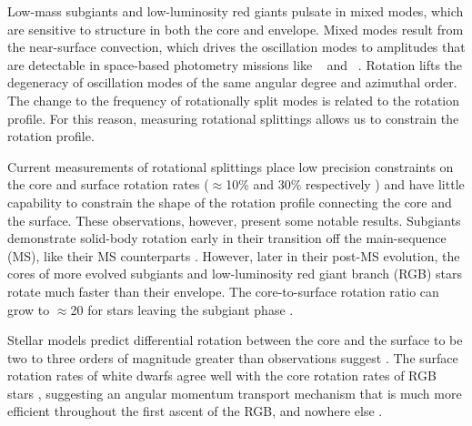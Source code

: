 Low-mass subgiants and low-luminosity red giants pulsate in mixed modes, which are sensitive to structure in both the core and envelope. Mixed modes result from the near-surface convection, which drives the oscillation modes to amplitudes that are detectable in space-based photometry missions like \corot\ \citep{baglin_corot_2003} and \kepler\ \citep{borucki_kepler_2010}. Rotation lifts the degeneracy of oscillation modes of the same angular degree and azimuthal order. The change to the frequency of rotationally split modes is related to the rotation profile. For this reason, measuring rotational splittings allows us to constrain the rotation profile.


Current measurements of rotational splittings place low precision constraints on the core and surface rotation rates ($\approx$10\% and 30\% respectively ) and have little capability to constrain the shape of the rotation profile connecting the core and the surface. These observations, however, present some notable results.
Subgiants demonstrate solid-body rotation early in their transition off the main-sequence (MS), like their MS counterparts \citep{deheuvels_seismic_2020,noll_probing_2021}. However, later in their post-MS evolution, the cores of more evolved subgiants and low-luminosity red giant branch (RGB) stars rotate much faster than their envelope. The core-to-surface rotation ratio can grow to $\approx$20 for stars leaving the subgiant phase \citep{deheuvels_seismic_2014, gehan_core_2018, eggenberger_asteroseismology_2019}.

Stellar models predict differential rotation between the core and the surface to be two to three orders of magnitude greater than observations suggest \citep{eggenberger_angular_2012, cantiello_angular_2014}. The surface rotation rates of white dwarfs agree well with the core rotation rates of RGB stars \citep{gough_glimpses_2015,hermes_deep_2017}, suggesting an angular momentum transport mechanism that is much more efficient throughout the first ascent of the RGB, and nowhere else \citep{eggenberger_angular_2012,marques_seismic_2013,ceillier_understanding_2013, fuller_asteroseismology_2015,spada_angular_2016,ouazzani_gamma_2018}.

